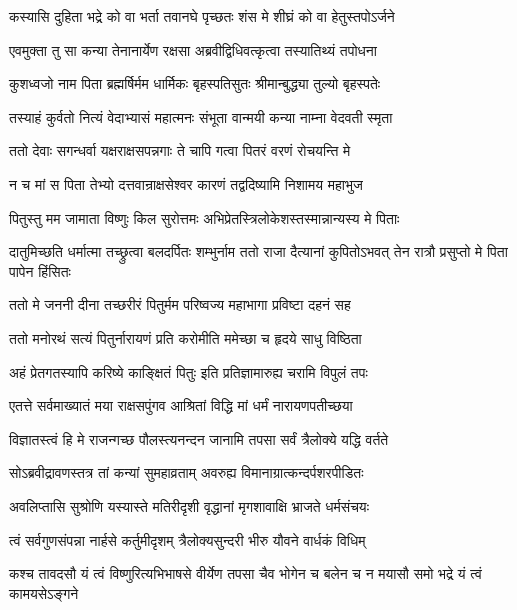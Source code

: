 \twolineshloka
{कस्यासि दुहिता भद्रे को वा भर्ता तवानघे}
{पृच्छतः शंस मे शीघ्रं को वा हेतुस्तपोऽर्जने} %

\twolineshloka
{एवमुक्ता तु सा कन्या तेनानार्येण रक्षसा}
{अब्रवीद्विधिवत्कृत्वा तस्यातिथ्यं तपोधना} %

\twolineshloka
{कुशध्वजो नाम पिता ब्रह्मर्षिर्मम धार्मिकः}
{बृहस्पतिसुतः श्रीमान्बुद्ध्या तुल्यो बृहस्पतेः} %

\twolineshloka
{तस्याहं कुर्वतो नित्यं वेदाभ्यासं महात्मनः}
{संभूता वान्मयी कन्या नाम्ना वेदवती स्मृता} %

\twolineshloka
{ततो देवाः सगन्धर्वा यक्षराक्षसपन्नगाः}
{ते चापि गत्वा पितरं वरणं रोचयन्ति मे} %

\twolineshloka
{न च मां स पिता तेभ्यो दत्तवान्राक्षसेश्वर}
{कारणं तद्वदिष्यामि निशामय महाभुज} %

\twolineshloka
{पितुस्तु मम जामाता विष्णुः किल सुरोत्तमः}
{अभिप्रेतस्त्रिलोकेशस्तस्मान्नान्यस्य मे पिताः} %

\threelineshloka
{दातुमिच्छति धर्मात्मा तच्छ्रुत्वा बलदर्पितः}
{शम्भुर्नाम ततो राजा दैत्यानां कुपितोऽभवत्}
{तेन रात्रौ प्रसुप्तो मे पिता पापेन हिंसितः} %

\twolineshloka
{ततो मे जननी दीना तच्छरीरं पितुर्मम}
{परिष्वज्य महाभागा प्रविष्टा दहनं सह} %

\twolineshloka
{ततो मनोरथं सत्यं पितुर्नारायणं प्रति}
{करोमीति ममेच्छा च हृदये साधु विष्ठिता} %

\twolineshloka
{अहं प्रेतगतस्यापि करिष्ये काङ्क्षितं पितुः}
{इति प्रतिज्ञामारुह्य चरामि विपुलं तपः} %

\twolineshloka
{एतत्ते सर्वमाख्यातं मया राक्षसपुंगव}
{आश्रितां विद्धि मां धर्मं नारायणपतीच्छया} %

\twolineshloka
{विज्ञातस्त्वं हि मे राजन्गच्छ पौलस्त्यनन्दन}
{जानामि तपसा सर्वं त्रैलोक्ये यद्धि वर्तते} %

\twolineshloka
{सोऽब्रवीद्रावणस्तत्र तां कन्यां सुमहाव्रताम्}
{अवरुह्य विमानाग्रात्कन्दर्पशरपीडितः} %

\twolineshloka
{अवलिप्तासि सुश्रोणि यस्यास्ते मतिरीदृशी}
{वृद्धानां मृगशावाक्षि भ्राजते धर्मसंचयः} %

\twolineshloka
{त्वं सर्वगुणसंपन्ना नार्हसे कर्तुमीदृशम्}
{त्रैलोक्यसुन्दरी भीरु यौवने वार्धकं विधिम्} %

\threelineshloka
{कश्च तावदसौ यं त्वं विष्णुरित्यभिभाषसे}
{वीर्येण तपसा चैव भोगेन च बलेन च}
{न मयासौ समो भद्रे यं त्वं कामयसेऽङ्गने} %


